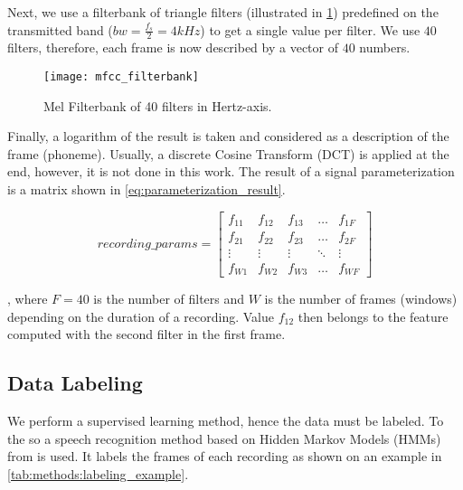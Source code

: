 \begin{enumerate}
Next, we use a filterbank of triangle filters (illustrated in \cref{fig:methods:mfcc_filterbank}) predefined on the transmitted band ($ bw = \frac{f_s}{2} = 4kHz $) to get a single value per filter. We use $ 40 $ filters, therefore, each frame is now described by a vector of $ 40 $ numbers.

\begin{figure}[H]
\centering
\texttt{[image: mfcc\_filterbank]}
\caption{Mel Filterbank of 40 filters in Hertz-axis.}
\label{fig:methods:mfcc_filterbank}
\end{figure}

Finally, a logarithm of the result is taken and considered as a description of the frame (phoneme). Usually, a discrete Cosine Transform (DCT) is applied at the end, however, it is not done in this work. The result of a signal parameterization is a matrix shown in \cref{eq:parameterization_result}.

\begin{equation} \label{eq:parameterization_result}
recording\_params = 
\begin{bmatrix}
    f_{11} & f_{12} & f_{13} & \dots  & f_{1F} \\
    f_{21} & f_{22} & f_{23} & \dots  & f_{2F} \\
    \vdots & \vdots & \vdots & \ddots & \vdots \\
    f_{W1} & f_{W2} & f_{W3} & \dots  & f_{WF}
\end{bmatrix}
\end{equation}

, where $ F = 40 $ is the number of filters and $ W $ is the number of frames (windows) depending on the duration of a recording. Value $ f_{12} $ then belongs to the feature computed with the second filter in the first frame.
\end{enumerate}

\subsection*{Data Labeling}
We perform a supervised learning method, hence the data must be labeled. To the so a speech recognition method based on Hidden Markov Models (HMMs) from \citep{smidl_pc} is used. It labels the frames of each recording as shown on an example in \cref{tab:methods:labeling_example}.

